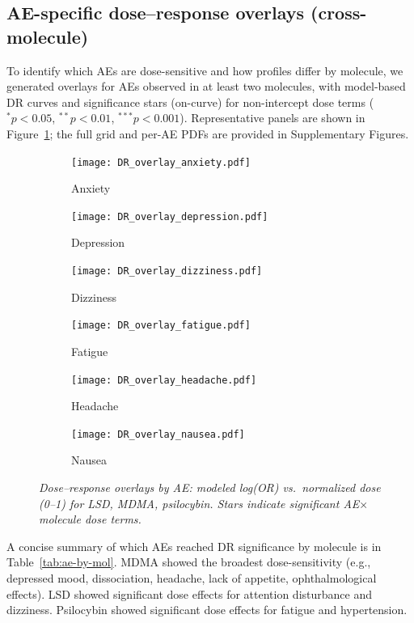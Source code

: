 \documentclass[12pt,a4paper]{article}
\begin{document}
\subsection{AE-specific dose--response overlays (cross-molecule)}
To identify which AEs are dose-sensitive and how profiles differ by molecule, we generated overlays for AEs observed in at least two molecules, with model-based DR curves and significance stars (on-curve) for non-intercept dose terms ($^{*}p<0.05$, $^{**}p<0.01$, $^{***}p<0.001$). Representative panels are shown in Figure~\ref{fig:dr_overlays_panels}; the full grid and per-AE PDFs are provided in Supplementary Figures.

\begin{figure}[htb]
  \centering
  \begin{subfigure}{0.32\textwidth}
    \texttt{[image: DR\_overlay\_anxiety.pdf]}
    \caption{Anxiety}
  \end{subfigure}\hfill
  \begin{subfigure}{0.32\textwidth}
    \texttt{[image: DR\_overlay\_depression.pdf]}
    \caption{Depression}
  \end{subfigure}\hfill
  \begin{subfigure}{0.32\textwidth}
    \texttt{[image: DR\_overlay\_dizziness.pdf]}
    \caption{Dizziness}
  \end{subfigure}

  \vspace{0.8em}

  \begin{subfigure}{0.32\textwidth}
    \texttt{[image: DR\_overlay\_fatigue.pdf]}
    \caption{Fatigue}
  \end{subfigure}\hfill
  \begin{subfigure}{0.32\textwidth}
    \texttt{[image: DR\_overlay\_headache.pdf]}
    \caption{Headache}
  \end{subfigure}\hfill
  \begin{subfigure}{0.32\textwidth}
    \texttt{[image: DR\_overlay\_nausea.pdf]}
    \caption{Nausea}
  \end{subfigure}

  \caption{\textit{Dose--response overlays by AE: modeled log(OR) vs.\ normalized dose (0--1) for LSD, MDMA, psilocybin. Stars indicate significant AE$\times$molecule dose terms.}}
  \label{fig:dr_overlays_panels}
\end{figure}

A concise summary of which AEs reached DR significance by molecule is in Table~\ref{tab:ae-by-mol}. MDMA showed the broadest dose-sensitivity (e.g., depressed mood, dissociation, headache, lack of appetite, ophthalmological effects). LSD showed significant dose effects for attention disturbance and dizziness. Psilocybin showed significant dose effects for fatigue and hypertension.
\end{document}
